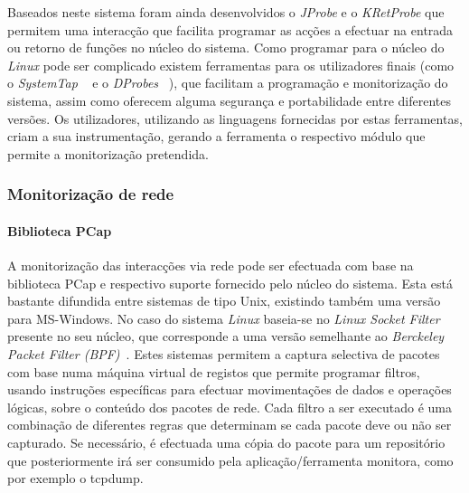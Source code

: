 \documentclass[a4paper]{llncs}
\newcommand{\td}[1]{\todo[inline]{#1}}
\begin{document}
 Baseados neste sistema foram ainda desenvolvidos o \textit{JProbe} e o \textit{KRetProbe} que permitem uma interacção que facilita programar as acções a efectuar na entrada ou retorno de funções no núcleo do sistema.
 Como programar para o núcleo do \textit{Linux} pode ser complicado existem ferramentas para os utilizadores finais (como o \textit{SystemTap} ~\cite{Jones2009} e o \textit{DProbes} ~\cite{:DProbes}),  que facilitam a programação e monitorização do sistema, assim como oferecem alguma segurança e portabilidade entre diferentes  versões. Os utilizadores, utilizando as linguagens fornecidas por estas ferramentas, criam a sua instrumentação, gerando a ferramenta o respectivo módulo que permite a monitorização pretendida.

\subsubsection{Monitorização de rede}
\label{subsub:mon_network__with_dynamic_filters_linux}

%
%
%
%

\paragraph{Biblioteca PCap\\}

A monitorização das interacções via rede pode ser efectuada com base na biblioteca PCap e respectivo suporte fornecido pelo núcleo do sistema.
 Esta está bastante difundida entre sistemas de tipo Unix, existindo também uma versão para MS-Windows.
No caso do sistema \textit{Linux} baseia-se no \textit{Linux Socket Filter} presente no seu núcleo, que corresponde a uma versão semelhante ao \textit{Berckeley Packet Filter (BPF)}~\cite{Mccanne92thebsd}.
 Estes sistemas permitem a captura selectiva de pacotes com base numa máquina virtual de registos que permite programar filtros, usando instruções específicas para efectuar movimentações de dados e operações lógicas, sobre o conteúdo dos pacotes de rede.
 Cada filtro a ser executado é uma combinação de diferentes regras que determinam se cada pacote deve ou não ser capturado.
 Se necessário, é efectuada uma cópia do pacote para um repositório que posteriormente irá ser consumido pela aplicação/ferramenta monitora, como por exemplo o tcpdump.
\end{document}
